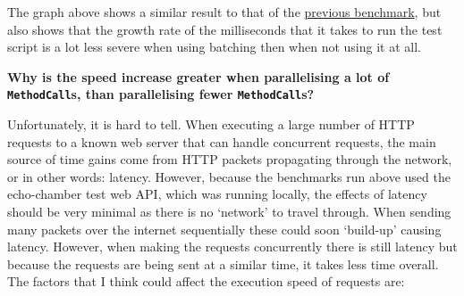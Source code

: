 The graph above shows a similar result to that of the \hyperref[sec:eval-ast-nodes-batch-bench-1-intro]{previous benchmark}, but also shows that the growth rate of the milliseconds that it takes to run the test script is a lot less severe when using batching then when not using it at all.

\cprotect\textbf{Why is the speed increase greater when parallelising a lot of \verb|MethodCall|s, than parallelising fewer \verb|MethodCall|s?}

Unfortunately, it is hard to tell. When executing a large number of HTTP requests to a known web server that can handle concurrent requests, the main source of time gains come from HTTP packets propagating through the network, or in other words: latency. However, because the benchmarks run above used the echo-chamber test web API, which was running locally, the effects of latency should be very minimal as there is no `network' to travel through. When sending many packets over the internet sequentially these could soon `build-up' causing latency. However, when making the requests concurrently there is still latency but because the requests are being sent at a similar time, it takes less time overall. The factors that I think could affect the execution speed of requests are:

